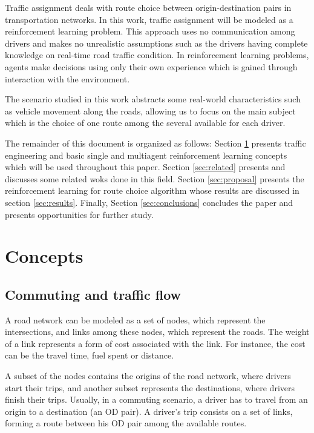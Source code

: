 \documentclass[12pt]{article}
\begin{document}

Traffic assignment deals with route choice between origin-destination pairs in transportation networks. In this work, traffic assignment will be modeled as a reinforcement learning problem. This approach uses no communication among drivers and makes no unrealistic assumptions such as the drivers having complete knowledge on real-time road traffic condition. In reinforcement learning problems, agents make decisions using only their own experience which is gained through interaction with the environment.

The scenario studied in this work abstracts some real-world characteristics such as vehicle movement along the roads, allowing us to focus on the main subject which is the choice of one route among the several available for each driver.

The remainder of this document is organized as follows: Section \ref{sec:concepts} presents traffic engineering and basic single and multiagent reinforcement learning concepts which will be used throughout this paper. Section \ref{sec:related} presents and discusses some related woks done in this field. Section \ref{sec:proposal} presents the reinforcement learning for route choice algorithm whose results are discussed in section \ref{sec:results}. Finally, Section \ref{sec:conclusions} concludes the paper and presents opportunities for further study.

\section{Concepts}
\label{sec:concepts}
\subsection{Commuting and traffic flow}

A road network can be modeled as a set of nodes, which represent the intersections, and links among these nodes, which represent the roads. The weight of a link represents a form of cost associated with the link. For instance, the cost can be the travel time, fuel spent or distance.

A subset of the nodes contains the origins of the road network, where drivers start their trips, and another subset represents the destinations, where drivers finish their trips. Usually, in a commuting scenario, a driver has to travel from an origin to a destination (an OD pair). A driver's trip consists on a set of links, forming a route between his OD pair among the available routes.
\end{document}
